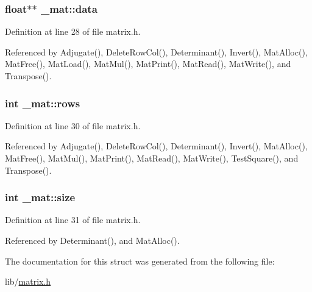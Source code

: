 \subsubsection[{\texorpdfstring{data}{data}}]{\setlength{\rightskip}{0pt plus 5cm}float$\ast$$\ast$ \+\_\+mat\+::data}\hypertarget{struct__mat_a00dcd82a8de11b7f16f7edfde55bcfae}{}\label{struct__mat_a00dcd82a8de11b7f16f7edfde55bcfae}


Definition at line 28 of file matrix.\+h.



Referenced by Adjugate(), Delete\+Row\+Col(), Determinant(), Invert(), Mat\+Alloc(), Mat\+Free(), Mat\+Load(), Mat\+Mul(), Mat\+Print(), Mat\+Read(), Mat\+Write(), and Transpose().

\subsubsection[{\texorpdfstring{rows}{rows}}]{\setlength{\rightskip}{0pt plus 5cm}int \+\_\+mat\+::rows}\hypertarget{struct__mat_a5e6bcb8b0c0239ca9b782c48b0b3c98a}{}\label{struct__mat_a5e6bcb8b0c0239ca9b782c48b0b3c98a}


Definition at line 30 of file matrix.\+h.



Referenced by Adjugate(), Delete\+Row\+Col(), Determinant(), Invert(), Mat\+Alloc(), Mat\+Free(), Mat\+Mul(), Mat\+Print(), Mat\+Read(), Mat\+Write(), Test\+Square(), and Transpose().

\subsubsection[{\texorpdfstring{size}{size}}]{\setlength{\rightskip}{0pt plus 5cm}int \+\_\+mat\+::size}\hypertarget{struct__mat_ab54203ad7b60fc23832cb3b2a863857f}{}\label{struct__mat_ab54203ad7b60fc23832cb3b2a863857f}


Definition at line 31 of file matrix.\+h.



Referenced by Determinant(), and Mat\+Alloc().



The documentation for this struct was generated from the following file\+:\begin{DoxyCompactItemize}
\item 
lib/\hyperlink{matrix_8h}{matrix.\+h}\end{DoxyCompactItemize}
